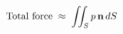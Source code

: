 \documentclass[preview]{standalone}
\begin{document}
\begin{align*}
\special{dvisvgm:raw <g id='unique000'>}\text{Total force}\;\approx\;\iint_S p\,\mathbf{n}\,dS\special{dvisvgm:raw </g>}
\end{align*}
\end{document}
